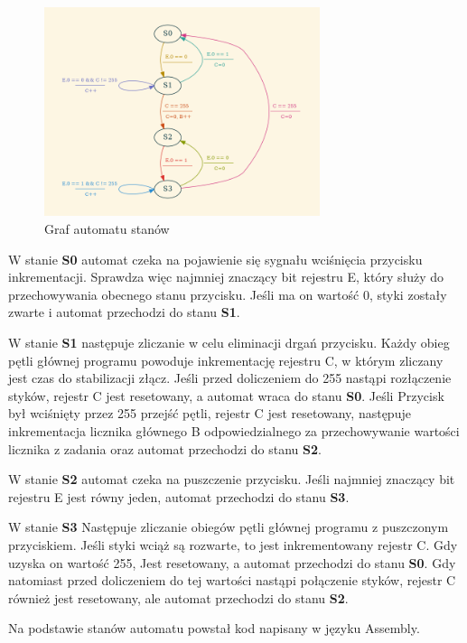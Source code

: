 \documentclass[fleqn]{article}
\begin{document}
\begin{figure}[H]
	\centering
	\includegraphics[width=0.72\textwidth]{img/graph.png}
	\caption{Graf automatu stanów}
	\label{fig:graph}
\end{figure}

\pagebreak

 W stanie \textbf{S0} automat czeka na pojawienie się sygnału wciśnięcia przycisku inkrementacji. Sprawdza więc najmniej znaczący bit rejestru E, który służy do przechowywania obecnego stanu przycisku. Jeśli ma on wartość 0, styki zostały zwarte i automat przechodzi do stanu \textbf{S1}.

 W stanie \textbf{S1} następuje zliczanie w celu eliminacji drgań przycisku. Każdy obieg pętli głównej programu powoduje inkrementację rejestru C, w którym zliczany jest czas do stabilizacji złącz. Jeśli przed doliczeniem do 255 nastąpi rozłączenie styków, rejestr C jest resetowany, a automat wraca do stanu \textbf{S0}. Jeśli Przycisk był wciśnięty przez 255 przejść pętli, rejestr C jest resetowany, następuje inkrementacja licznika głównego B odpowiedzialnego za przechowywanie wartości licznika z zadania oraz automat przechodzi do stanu \textbf{S2}.

W stanie \textbf{S2} automat czeka na puszczenie przycisku. Jeśli najmniej znaczący bit rejestru E jest równy jeden, automat przechodzi do stanu \textbf{S3}.

W stanie \textbf{S3} Następuje zliczanie obiegów pętli głównej programu z puszczonym przyciskiem. Jeśli styki wciąż są rozwarte, to jest inkrementowany rejestr C. Gdy uzyska on wartość 255, Jest resetowany, a automat przechodzi do stanu \textbf{S0}. Gdy natomiast przed doliczeniem do tej wartości nastąpi połączenie styków, rejestr C również jest resetowany, ale automat przechodzi do stanu \textbf{S2}.

Na podstawie stanów automatu powstał kod napisany w języku Assembly.
\end{document}
